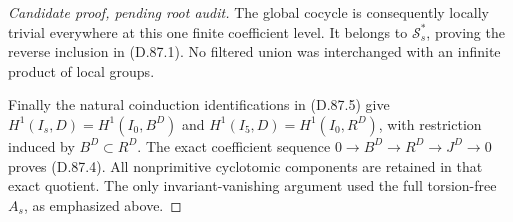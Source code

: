 \begin{proof}[Candidate proof, pending root audit]
The global cocycle is consequently locally trivial everywhere
at this one finite coefficient level. It belongs to
\(\mathcal S_s^*\), proving the reverse inclusion in (D.87.1).
No filtered union was interchanged with an infinite product
of local groups.

Finally the natural coinduction identifications in (D.87.5)
give \(H^1(I_s,D)=H^1(I_0,B^D)\) and
\(H^1(I_5,D)=H^1(I_0,R^D)\), with restriction induced by
\(B^D\subset R^D\). The exact coefficient sequence
\(0\to B^D\to R^D\to J^D\to0\) proves (D.87.4).
All nonprimitive cyclotomic components are retained in that
exact quotient. The only invariant-vanishing argument used
the full torsion-free \(A_s\), as emphasized above.
\end{proof}
